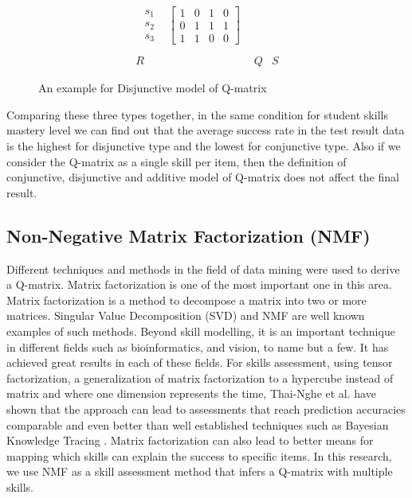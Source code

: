 \begin{figure}
\begin{footnotesize}
\[\begin{array}{ccc}
\begin{array}{cc}
\begin{array}{c}
s_{1}\\
s_{2}\\
s_{3}
\end{array} & \left[\begin{array}{cccc}
1 & 0 & 1 & 0\\
0 & 1 & 1 & 1\\
1 & 1 & 0 & 0
\end{array}\right]
\end{array}\\
\\
R & Q & S
\end{array}
\]
 \end{footnotesize} \caption{An example for Disjunctive model of Q-matrix}


\label{fig1Dis} 
\end{figure}

Comparing these three types together, in the same condition for student skills mastery level we can find out that the average success rate in the test result data is the highest for disjunctive type and the lowest for conjunctive type. Also if we consider the Q-matrix as a single skill per item, then the definition of conjunctive, disjunctive and additive model of Q-matrix does not affect the final result.


\subsection{Non-Negative Matrix Factorization (\ac{NMF})}

Different techniques and methods in the field of data mining were used to derive a Q-matrix. Matrix factorization is one of the most important one in this area. Matrix factorization is a method to decompose a matrix into two or more matrices. Singular Value Decomposition (SVD) and NMF are well known examples of such methods. Beyond skill modelling, it is an important technique in different fields such as bioinformatics, and vision, to name but a few. It has achieved great results in each of these fields. For skills assessment, using tensor factorization, a generalization of matrix factorization to a hypercube instead of matrix and where one dimension represents the time, Thai-Nghe et al. \citep{Nguyen2011} have shown that the approach can lead to assessments that reach prediction accuracies comparable and even better than well established techniques such as Bayesian Knowledge Tracing \citep{corbett:umuai:1995}. Matrix factorization can also lead to better means for mapping which skills can explain the success to specific items. In this research, we use NMF as a skill assessment method that infers a Q-matrix with multiple skills.

